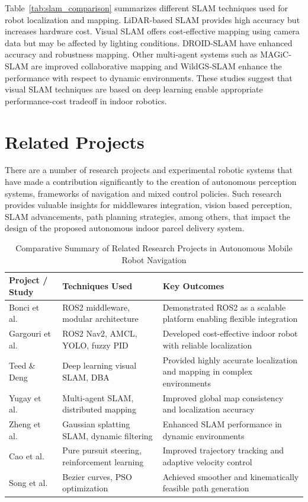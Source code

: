 Table~\ref{tab:slam_comparison} summarizes different SLAM techniques used for robot localization and mapping. LiDAR-based SLAM provides high accuracy but increases hardware cost. Visual SLAM offers cost-effective mapping using camera data but may be affected by lighting conditions. DROID-SLAM have enhanced accuracy and robustness mapping. Other multi-agent systems such as MAGiC-SLAM are improved collaborative mapping and WildGS-SLAM enhance the performance with respect to dynamic environments. These studies suggest that visual SLAM techniques are based on deep learning enable appropriate performance-cost tradeoff in indoor robotics.

\section{Related Projects}

There are a number of research projects and experimental robotic systems that have made a contribution significantly to the creation of autonomous perception systems, frameworks of navigation and mixed control policies. Such research provides valuable insights for middlewares integration, vision based perception, SLAM advancements, path planning strategies, among others, that impact the design of the proposed autonomous indoor parcel delivery system.

\begin{table}[htbp]
\centering
\caption{Comparative Summary of Related Research Projects in Autonomous Mobile Robot Navigation}
\label{tab:related_projects}
\begin{tabular}{|p{3cm}|p{4.5cm}|p{6cm}|}
\hline
\textbf{Project / Study} & \textbf{Techniques Used} & \textbf{Key Outcomes} \\
\hline
Bonci et al.~\cite{bonci2023ros2} & ROS2 middleware, modular architecture & Demonstrated ROS2 as a scalable platform enabling flexible integration \\
\hline
Gargouri et al.~\cite{gargouri2024cost} & ROS2 Nav2, AMCL, YOLO, fuzzy PID & Developed cost-effective indoor robot with reliable localization \\
\hline
Teed \& Deng~\cite{teed2021droid} & Deep learning visual SLAM, DBA & Provided highly accurate localization and mapping in complex environments \\
\hline
Yugay et al.~\cite{yugay2024magic} & Multi-agent SLAM, distributed mapping & Improved global map consistency and localization accuracy \\
\hline
Zheng et al.~\cite{zheng2025wildgs} & Gaussian splatting SLAM, dynamic filtering & Enhanced SLAM performance in dynamic environments \\
\hline
Cao et al.~\cite{cao2024pure} & Pure pursuit steering, reinforcement learning & Improved trajectory tracking and adaptive velocity control \\
\hline
Song et al.~\cite{song2020smooth} & Bezier curves, PSO optimization & Achieved smoother and kinematically feasible path generation \\
\hline
\end{tabular}
\end{table}

